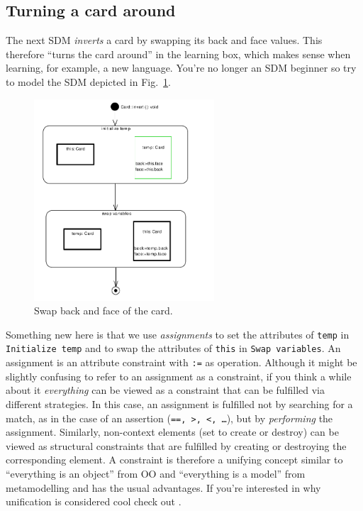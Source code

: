 \subsection{Turning a card around} 

The next SDM \emph{inverts} a card by swapping its back and face values.  This
therefore ``turns the card around'' in the learning box, which makes sense when
learning, for example, a new language.  You're no longer an SDM beginner so try
to model the SDM depicted in Fig.~\ref{fig:sdm_invert}.

\begin{figure}[htbp]
\begin{center}
  \includegraphics[width=0.6\textwidth]{pics/sdmBilder/invert/sdm54}
  \caption{Swap back and face of the card.}  
  \label{fig:sdm_invert}
\end{center}
\end{figure}

Something new here is that we use \emph{assignments} to set the attributes of
\texttt{temp} in \texttt{Initialize temp} and to swap the attributes of
\texttt{this} in \texttt{Swap variables}.  An assignment is an attribute
constraint with \texttt{:=} as operation.  Although it might be slightly
confusing to refer to an assignment as a constraint, if you think a while about
it \emph{everything} can be viewed as a constraint that can be fulfilled via
different strategies.  In this case, an assignment is fulfilled not by searching
for a match, as in the case of an assertion (\texttt{==, >, <, \ldots}), but by
\emph{performing} the assignment.  Similarly, non-context elements (set to
create or destroy) can be viewed as structural constraints that are fulfilled by
creating or destroying the corresponding element.  A constraint is therefore
a unifying concept similar to ``everything is an object'' from OO and
``everything is a model'' from metamodelling and has the usual advantages.  If
you're interested in why unification is considered cool check out \cite{BEZ05}.

